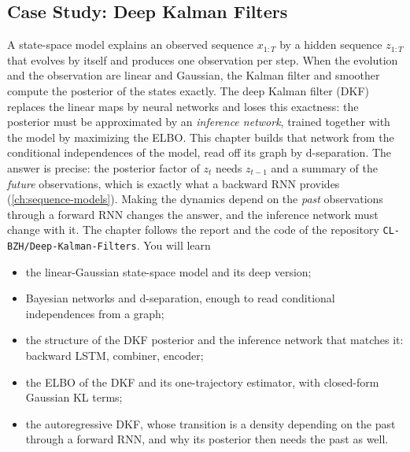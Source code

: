 \begin{notechapter}
\chapter{Case Study: Deep Kalman Filters}\label{ch:deep-kalman-filters}

\begin{chapterintro}
A state-space model explains an observed sequence $x_{1:T}$ by a hidden sequence $z_{1:T}$ that evolves
by itself and produces one observation per step. When the evolution and the observation are
linear and Gaussian, the Kalman filter and smoother compute the posterior of the states
exactly. The deep Kalman filter (DKF) replaces the linear maps by neural networks and loses
this exactness: the posterior must be approximated by an \emph{inference network}, trained
together with the model by maximizing the ELBO. This chapter builds that network from the
conditional independences of the model, read off its graph by d-separation. The answer is
precise: the posterior factor of $z_t$ needs $z_{t-1}$ and a summary of the \emph{future} observations, which
is exactly what a backward RNN provides (\cref{ch:sequence-models}). Making the dynamics depend
on the \emph{past} observations through a forward RNN changes the answer, and the inference
network must change with it. The chapter follows the report and the code of the repository
\texttt{CL-BZH/Deep-Kalman-Filters}. You will learn
\begin{itemize}[nosep]
  \item the linear-Gaussian state-space model and its deep version;
  \item Bayesian networks and d-separation, enough to read conditional independences from a
        graph;
  \item the structure of the DKF posterior and the inference network that matches it:
        backward LSTM, combiner, encoder;
  \item the ELBO of the DKF and its one-trajectory estimator, with closed-form Gaussian KL
        terms;
  \item the autoregressive DKF, whose transition is a density depending on the past through a
        forward RNN, and why its posterior then needs the past as well.
\end{itemize}
\end{chapterintro}


\end{notechapter}

